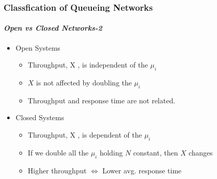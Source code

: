 \documentclass{beamer}
\begin{document}
\begin{frame}
    \frametitle{Classfication of Queueing Networks}
    \framesubtitle{\textbf{\textit{Open vs Closed Networks-2}}}
	\begin{itemize}
		\item Open Systems
		\begin{itemize}
			\item Throughput, X , is independent of the $\mu_i$
			\item $X$ is not affected by doubling the $\mu_i$
			\item Throughput and response time are not related.
		\end{itemize}
		\item Closed Systems
		\begin{itemize}
			\item Throughput, X , is dependent of the $\mu_i$
			\item  If we double all the $\mu_i$ holding $N$ constant, then $X$ 					changes 
			\item Higher throughput $\Longleftrightarrow$ Lower avg. response 					time
		\end{itemize}
			  
	\end{itemize}	    
    
\end{frame}

    
\end{document}
